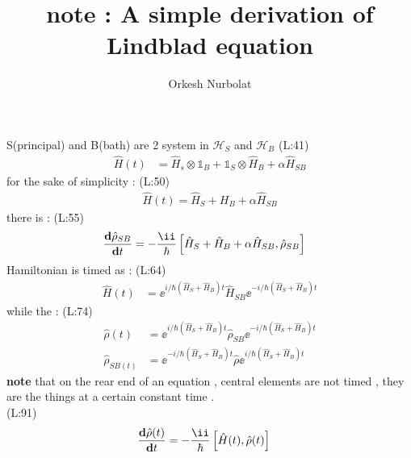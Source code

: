 \title{note : A simple derivation of Lindblad equation}
\author{Orkesh Nurbolat}
\maketitle
 S(principal) and B(bath) are 2 system in 
 $ \mathcal{H }_{S } $  and 
 $ \mathcal{H }_{B } $ (L:41)
\begin{equation}
\begin{split}
\hat{H }(t )&=\hat{H }_{s }\otimes \mathds{1}_{B }+\mathds{1}_{S }\otimes \hat{H }_{B }+\alpha \hat{H }_{S B }\end{split}
\end{equation}
 for the sake of simplicity :
(L:50)
\begin{equation}
\begin{split}
\label{hamDef}\hat{H }(t )=\hat{H }_{S }+H _{B }+\alpha \hat{H }_{S B }\end{split}
\end{equation}
 there is :
(L:55)
\begin{equation}
\begin{split}
\dfrac{\bold{d}\hat{\rho }_{S B }}{\bold{d}t }&=-\frac{\ii }{\hbar }\left[\hat{H }_{S }+\hat{H }_{B }+\alpha \hat{H }_{S B },\hat{\rho }_{S B }\right]\end{split}
\end{equation}
 Hamiltonian is timed as :
(L:64)
\begin{equation}
\begin{split}
\hat{H }(t )&=\ee ^{i /\hbar (\hat{H }_{S }+\hat{H }_{B })t }\hat{H }_{S B }\ee ^{-i /\hbar (\hat{H }_{S }+\hat{H }_{B })t }\end{split}
\end{equation}
 while the : 
(L:74)
\begin{equation}
\begin{split}
\hat{\rho }(t )&=\ee ^{i /\hbar (\hat{H }_{S }+\hat{H }_{B })t }\hat{\rho }_{S B }\ee ^{-i /\hbar (\hat{H }_{S }+\hat{H }_{B })t }\\
\hat{\rho }_{S B (t )}&=\ee ^{-i /\hbar (\hat{H }_{S }+\hat{H }_{B })t }\hat{\rho }\ee ^{i /\hbar (\hat{H }_{S }+\hat{H }_{B })t }\end{split}
\end{equation}
 \textbf{note }
 that on the rear end of an equation , central elements are not
 timed , they are the things at a certain constant time . \\
(L:91)
\begin{equation}
\begin{split}
\dfrac{\bold{d}\hat{\rho }(t )}{\bold{d}t }&=-\dfrac{\ii }{\hbar }\left[\hat{H }(t ),\hat{\rho }(t )\right]\end{split}
\end{equation}
